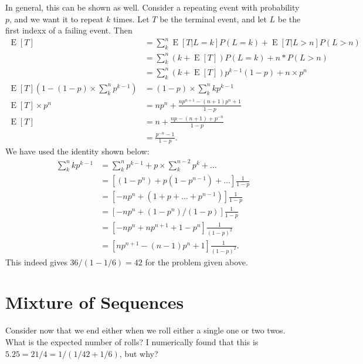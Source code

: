\documentclass[12pt]{report}
\newcommand*{\p}[1]{\left(#1\right)}
\DeclareMathOperator{\E}{E}
\begin{document}
In general, this can be shown as well. Consider a repeating event with
probability $p$, and we want it to repeat $k$ times. Let $T$ be the terminal
event, and let $L$ be the first indexx of a failing event. Then
\begin{align*}
    \E[T] &= \sum_k^n \E[T | L = k] P(L = k) + \E[T | L > n]P(L > n)\\
        &= \sum_k^n (k + \E[T]) P(L = k) + n * P(L > n)\\
        &= \sum_k^n (k + \E[T]) p^{k - 1}(1-p) + n \times p^n\\
    \E[T](1 - (1-p) \times \sum_k^n p^{k - 1}) &= (1 - p) \times \sum_k^n k p^{k - 1}\\
    \E[T] \times p^{n} &= n p^n + \frac{n p^{n + 1} - (n + 1) p^n + 1}
        {1 - p}\\
    \E[T] &= n + \frac{n p - (n + 1) + p^{-n}}{1 - p}\\
        &= \frac{p^{-n} - 1}{1 - p}.
\end{align*}
We have used the identity shown below:
\begin{align*}
    \sum_k^n kp^{k - 1}
        &= \sum_k^n p^{k - 1} + p \times \sum_k^{n - 2} p^k + \dots\\
        &= [(1 - p^{n}) + p (1 - p^{n - 1}) + \dots] \frac{1}{1 - p}\\
        &= [-n p^{n} + (1 + p + \dots + p^{n - 1})] \frac{1}{1 - p}\\
        &= [-n p^{n} + (1 - p^{n}) / (1 - p)] \frac{1}{1 - p}\\
        &= [-n p^n + n p^{n + 1} + 1 - p^n] \frac{1}{(1 - p)^2}\\
        &= [np^{n + 1} - (n - 1) p^n + 1] \frac{1}{(1 - p)^2}.
\end{align*}
This indeed gives $36 / (1 - 1/6) = 42$ for the problem given above.

\section{Mixture of Sequences}

Consider now that we end either when we roll either a single one or two twos.
What is the expected number of rolls? I numerically found that this is $5.25 =
21/4 = 1 / \p{1 / 42 + 1 / 6}$, but why?
\end{document}
